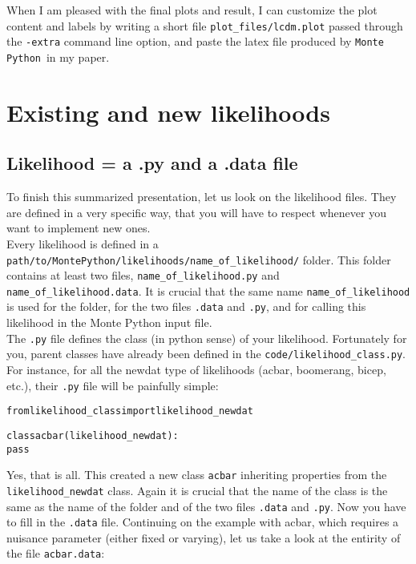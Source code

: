 \documentclass[10pt]{article}
\newcommand{\MP}{\texttt{Monte Python}}
\begin{document}
When I am pleased with the final plots and result, I can customize the plot content and labels by writing a short file \verb?plot_files/lcdm.plot? passed through the \verb?-extra? command line option, and paste the latex file produced by \MP~in my paper.

\section{Existing and new likelihoods\label{likelihoods}}


  \subsection{Likelihood = a .py and a .data file\label{ssec:lkl}}

  To finish this summarized presentation, let us look on the likelihood files.
  They are defined in a very specific way, that you will have to respect
  whenever you want to implement new ones.\\

  Every likelihood is defined in a
  \verb?path/to/MontePython/likelihoods/name_of_likelihood/?
  folder. This folder contains at least two files, \verb?name_of_likelihood.py?
  and \verb?name_of_likelihood.data?. It is crucial that the same name \verb?name_of_likelihood? is used for the folder,
  for the two files {\tt .data} and {\tt.py}, and for calling this likelihood in the Monte Python input file.\\

  The \verb?.py? file defines the class (in python sense) of your likelihood.
  Fortunately for you, parent classes have already been defined in the
  \verb?code/likelihood_class.py?. For instance, for all the newdat type of
  likelihoods (acbar, boomerang, bicep, etc.), their \verb?.py? file will be
  painfully simple:

  \begin{alltt}
  from likelihood_class import likelihood_newdat

  class acbar(likelihood_newdat):
    pass
  \end{alltt}

  Yes, that is all. This created a new class \verb?acbar? inheriting properties from the \verb?likelihood_newdat? class. Again it is crucial that the name of the class is the same as the name of the folder and of the two files {\tt .data} and {\tt.py}.
    Now you have to fill in the \verb?.data? file. Continuing
  on the example with acbar, which requires a nuisance parameter (either fixed
  or varying), let us take a look at the entirity of the file
  \verb?acbar.data?:
  
\end{document}
